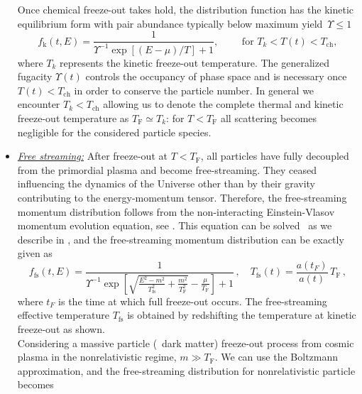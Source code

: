 \begin{itemize}
Once chemical freeze-out takes hold, the distribution function has the kinetic equilibrium form with pair abundance typically below maximum yield~$\Upsilon \le 1$
\begin{equation}\label{kinetic:equilibrium}
f_\mathrm{k}(t,E)=\frac{1}{\Upsilon^{-1}\exp[(E-\mu)/T]+1},\qquad \text{ for }T_k< T(t)< T_\mathrm{ch},
\end{equation}
where $T_k$ represents the kinetic freeze-out temperature. The generalized fugacity $\Upsilon(t)$ controls the occupancy of phase space and is necessary once $T(t)<T_\mathrm{ch}$ in order to conserve the particle number. {\color{black} In general we encounter $T_k<T_{\mathrm{ch}}$ allowing us to denote the complete thermal and kinetic freeze-out temperature as $T_\mathrm{F}\simeq T_k$: for $T< T_\mathrm{F}$ all scattering becomes negligible for the considered particle species.}\\[-0.2cm]
%
\item \underline{\it Free streaming:\/}
{\color{black}After freeze-out at $T<T_\mathrm{F}$, all particles have fully decoupled from the primordial plasma and become free-streaming. They ceased influencing the dynamics of the Universe  other than by their gravity contributing  to the energy-momentum tensor. Therefore, the free-streaming momentum distribution follows from the non-interacting  Einstein-Vlasov momentum evolution equation, see .  This equation} can be solved~\cite{Choquet-Bruhat:2009xil} as we describe in ,  and the free-streaming momentum distribution can be exactly given as~\cite{Birrell:2012gg}
\begin{equation}\label{freeStreamDist}
f_\mathrm{fs}(t,E)=\frac{1}{\Upsilon^{-1}\exp{\left[\sqrt{\frac{E^2-m^2}{T_\mathrm{fs}^2}+\frac{m^2}{T^2_\mathrm{F}}}-\frac{\mu}{T_\mathrm{F}}\right]+1}}\,,
\quad T_\mathrm{fs}(t)=\frac{a(t_F)}{a(t)}\,T_\mathrm{F}\,,
\end{equation}
{\color{black}where $t_F$ is the time at which full freeze-out occurs. The free-streaming effective temperature $T_\mathrm{fs}$ is obtained by redshifting the temperature at kinetic freeze-out as shown.}\\[0.2cm] 
%
Considering a massive particle (\eg\ dark matter) freeze-out process from cosmic plasma in the nonrelativistic regime, $m\gg T_\mathrm{F}$. We can use the
Boltzmann approximation, and the free-streaming distribution for nonrelativistic particle becomes

\end{itemize}

